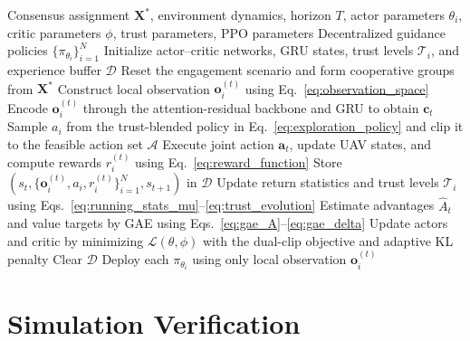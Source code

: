 \documentclass[lettersize,journal]{IEEEtran}
\providecommand{\DIFadd}[1]{{\protect\color{blue} #1}} %
\providecommand{\DIFdel}[1]{} %
\providecommand{\DIFaddbegin}{} %
\providecommand{\DIFaddend}{} %
\providecommand{\DIFdelbegin}{} %
\providecommand{\DIFdelend}{} %
\begin{document}
\begin{algorithm}[!t]
\caption{ART-MAPPO Cooperative Interception Guidance}
\label{alg:artmappo}
\footnotesize
\begin{algorithmic}[1]
\REQUIRE Consensus assignment $\mathbf{X}^{*}$, environment dynamics, horizon $T$, actor
parameters $\theta_i$, critic parameters $\phi$, trust parameters, PPO parameters
\ENSURE Decentralized guidance policies $\{\pi_{\theta_i}\}_{i=1}^{N}$
\STATE Initialize actor--critic networks, GRU states, trust levels $\mathcal{T}_i$, and
experience buffer $\mathcal{D}$
    \STATE Reset the engagement scenario and form cooperative groups from $\mathbf{X}^{*}$
            \STATE Construct local observation $\mathbf{o}_i^{(t)}$ using
            \DIFdelbegin \DIFdel{Eqs}\DIFdelend \DIFaddbegin \DIFadd{Eq}\DIFaddend .~\eqref{eq:observation_space}
            \DIFdelbegin \DIFdel{--}%
\DIFdelend \STATE Encode $\mathbf{o}_i^{(t)}$ through the attention-residual backbone and
            GRU to obtain $\mathbf{c}_t$
            \STATE Sample $a_i$ from the trust-blended policy in Eq.~\eqref{eq:exploration_policy}
            and clip it to the feasible action set $\mathcal{A}$
        \ENDFOR
        \STATE Execute joint action $\mathbf{a}_t$, update UAV states, and compute rewards
        $r_i^{(t)}$ using Eq.~\eqref{eq:reward_function}
        \STATE Store $(s_t,\{\mathbf{o}_i^{(t)},a_i,r_i^{(t)}\}_{i=1}^{N},s_{t+1})$ in
        $\mathcal{D}$
    \ENDFOR
    \STATE Update return statistics and trust levels $\mathcal{T}_i$ using
    Eqs.~\eqref{eq:running_stats_mu}--\eqref{eq:trust_evolution}
    \STATE Estimate advantages $\hat{A}_t$ and value targets by GAE using
    Eqs.~\eqref{eq:gae_A}--\eqref{eq:gae_delta}
    \STATE Update actors and critic by minimizing $\mathcal{L}(\theta,\phi)$ with the
    dual-clip objective and adaptive KL penalty
    \STATE Clear $\mathcal{D}$
\ENDFOR
\STATE Deploy each $\pi_{\theta_i}$ using only local observation $\mathbf{o}_i^{(t)}$
\end{algorithmic}
\end{algorithm}










\section{Simulation Verification}
\label{sec:simulation}
\end{document}

